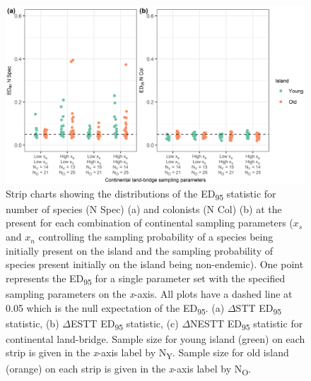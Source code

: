 \begin{figure}
    \centering
    \includegraphics{nonoceanic_land_bridge_sampling_parameters_num_spec_col.png}
    \caption{Strip charts showing the distributions of the ED\textsubscript{95} statistic for number of species (N Spec) (a) and colonists (N Col) (b) at the present for each combination of continental sampling parameters ($x_s$ and $x_n$ controlling the sampling probability of a species being initially present on the island and the sampling probability of species present initially on the island being non-endemic). One point represents the ED\textsubscript{95} for a single parameter set with the specified sampling parameters on the \textit{x}-axis. All plots have a dashed line at 0.05 which is the null expectation of the ED\textsubscript{95}. (a) $\Delta$STT ED\textsubscript{95} statistic, (b) $\Delta$ESTT ED\textsubscript{95} statistic, (c) $\Delta$NESTT ED\textsubscript{95} statistic for continental land-bridge. Sample size for young island (green) on each strip is given in the \textit{x}-axis label by N\textsubscript{Y}. Sample size for old island (orange) on each strip is given in the \textit{x}-axis label by N\textsubscript{O}.}
    \label{fig:nonoceanic_land_bridge_sampling_parameters_num_spec_col}
\end{figure}

